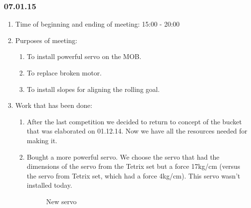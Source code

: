 \subsubsection{07.01.15}

\begin{enumerate}
	\item Time of beginning and ending of meeting: 15:00 - 20:00
	
	\item Purposes of meeting:  
	\begin{enumerate}
		\item To install powerful servo on the MOB.
		
		\item To replace broken motor.
		
		\item To install slopes for aligning the rolling goal.
	\end{enumerate}
	
	\item Work that has been done:
	\begin{enumerate}
		
		\item After the last competition we decided to return to concept of the bucket that was elaborated on 01.12.14. Now we have all the resources needed for making it.
		
		\item Bought a more powerful servo. We choose the servo that had the dimensions of the servo from the Tetrix set but a force 17kg/cm (versus the servo from Tetrix set, which had a force 4kg/cm). This servo wasn't installed today. 
		\begin{figure}[H]
			\begin{minipage}[h]{1\linewidth}
				\caption{New servo}
			\end{minipage}
		\end{figure}
		

\end{enumerate}
\end{enumerate}

